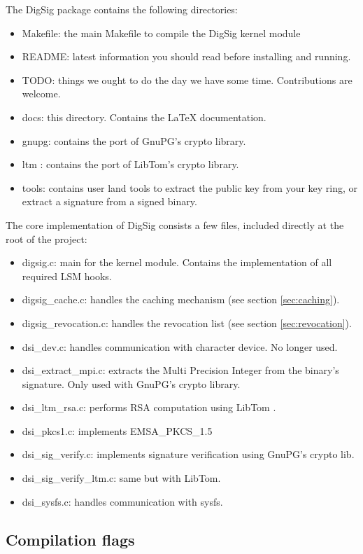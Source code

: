\documentclass{article}
\begin{document}
The DigSig package contains the following directories:

\begin{itemize}
\item Makefile: the main Makefile to compile the DigSig kernel module
\item README: latest information you should read before installing and running.
\item TODO: things we ought to do the day we have some time. Contributions are welcome.
\item docs: this directory. Contains the LaTeX documentation.
\item gnupg: contains the port of GnuPG's crypto library.
\item ltm : contains the port of LibTom's crypto library.
\item tools: contains user land tools to extract the public key from your key ring, or extract a signature
from a signed binary.
\end{itemize}

The core implementation of DigSig consists a few files, included directly at the root of the project:
\begin{itemize}
\item digsig.c: main for the kernel module. Contains the implementation of all required LSM hooks.
\item digsig\_cache.c: handles the caching mechanism (see section \ref{sec:caching}).
\item digsig\_revocation.c: handles the revocation list (see section \ref{sec:revocation}).
\item dsi\_dev.c: handles communication with character device. No longer used.
\item dsi\_extract\_mpi.c: extracts the Multi Precision Integer from the binary's signature. Only used
with GnuPG's crypto library.
\item dsi\_ltm\_rsa.c: performs RSA computation using LibTom \cite{ltm}.
\item dsi\_pkcs1.c: implements EMSA\_PKCS\_1.5
\item dsi\_sig\_verify.c: implements signature verification using GnuPG's crypto lib.
\item dsi\_sig\_verify\_ltm.c: same but with LibTom.
\item dsi\_sysfs.c: handles communication with sysfs.
\end{itemize}

\subsection{Compilation flags}
\label{sec:flags}
\end{document}
